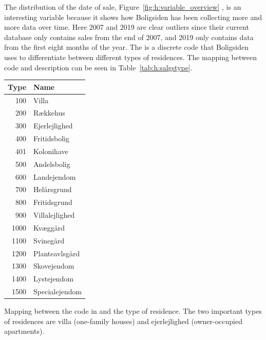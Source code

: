 The distribution of the date of sale, Figure~\ref{fig:h:variable_overview} , is an interesting variable because it shows how Boligsiden has been collecting more and more data over time. Here \num{2007} and \num{2019} are clear outliers since their current database only contains sales from the end of \num{2007}, and \num{2019} only contains data from the first eight months of the year. The  is a discrete code that Boligsiden uses to differentiate between different types of residences. The mapping between code and description can be seen in Table~\ref{tab:h:salgstype}. 

\begin{margintable}
  \centering
  \begin{tabular}{@{}rl@{}}
  Type & Name           \\ 
  \midrule
  100  & Villa          \\ 
  200  & Rækkehus       \\
  300  & Ejerlejlighed  \\
  400  & Fritidsbolig   \\
  401  & Kolonihave     \\
  500  & Andelsbolig    \\
  600  & Landejendom    \\
  700  & Helårsgrund    \\
  800  & Fritidsgrund   \\
  900  & Villalejlighed \\
  1000 & Kvæggård       \\
  1100 & Svinegård      \\
  1200 & Planteavlsgård \\
  1300 & Skovejendom    \\
  1400 & Lystejendom    \\
  1500 & Specialejendom \\ 
  \end{tabular}
  \vspace{\abovecaptionskip}
  \caption[Mapping between the Code in  and the Type of Residence]{Mapping between the code in  and the type of residence. The two important types of residences are villa (one-family houses) and ejerlejlighed (owner-occupied apartments).}
  \label{tab:h:salgstype}
\end{margintable}

